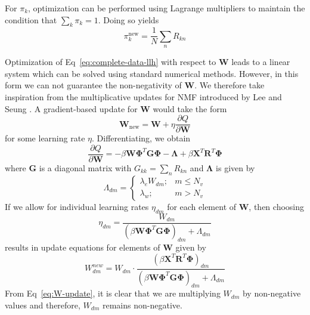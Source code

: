 \documentclass[remotesensing,article,submit,pdftex,moreauthors]{Definitions/mdpi}
\begin{document}
For $\pi_k$, optimization can be performed using Lagrange multipliers to maintain the condition that $\sum_k\pi_k=1$. Doing so yields
\begin{equation}\label{eq:pi-update}
    \pi_k^{\text{new}}  = \frac{1}{N}\sum_n R_{kn}
\end{equation}

Optimization of Eq~\ref{eq:complete-data-llh} with respect to $\mathbf{W}$ leads to a linear system which can be solved using standard numerical methods. However, in this form we can not guarantee the non-negativity of $\mathbf{W}$. We therefore take inspiration from the multiplicative updates for NMF introduced by Lee and Seung \cite{nmf-orig}. A gradient-based update for $\mathbf{W}$ would take the form
\begin{equation}
    \mathbf{W}_{\text{new}} = \mathbf{W} + \eta\frac{\partial Q}{\partial \mathbf{W}}
\end{equation}
for some learning rate $\eta$. Differentiating, we obtain
\begin{equation}
    \frac{\partial Q}{\partial \mathbf{W}} = -\beta \mathbf{W}\mathbf{\Phi}^T\mathbf{G}\mathbf{\Phi} - \mathbf{\Lambda} + \beta \mathbf{X}^T\mathbf{R}^T\mathbf{\Phi}
\end{equation}
where $\mathbf{G}$ is a diagonal matrix with $G_{kk} = \sum_n R_{kn}$ and $\mathbf{\Lambda}$ is given by 
\begin{equation}
    \Lambda_{dm} = \begin{cases}
        \lambda_e W_{dm}; & m \leq N_v \\ 
        \lambda_w; & m > N_v
    \end{cases}
\end{equation}
If we allow for individual learning rates $\eta_{dm}$ for each element of $\mathbf{W}$, then choosing 
\begin{equation}
    \eta_{dm} = \frac{W_{dm}}{\left(\beta \mathbf{W}\mathbf{\Phi}^T\mathbf{G}\mathbf{\Phi}\right)_{dm} + \Lambda_{dm}}
\end{equation}
results in update equations for elements of $\mathbf{W}$ given by
\begin{equation}\label{eq:W-update}
    W_{dm}^{new}  = W_{dm} \cdot \dfrac{\left(\beta \mathbf{X}^T\mathbf{R}^T\mathbf{\Phi}\right)_{dm}}{\left(\beta \mathbf{W}\mathbf{\Phi}^T\mathbf{G}\mathbf{\Phi}\right)_{dm} + \Lambda_{dm}}
\end{equation}
From Eq~\ref{eq:W-update}, it is clear that we are multiplying $W_{dm}$ by non-negative values and therefore, $W_{dm}$ remains non-negative.
\end{document}
